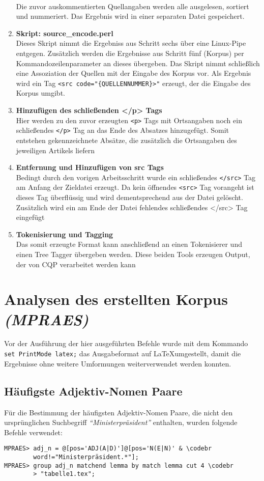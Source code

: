\documentclass[%
	type=document,%
  	style=article,%
  	media=print,
  	pages=oneside,%
  	prefixLecturer=Dozenten:,
  	author=multiple,
]{unihildesheim} %
\newcommand{\codebr}{\textbf{\rotatebox[origin=c]{180}{$\Rsh$}}}
\begin{document}
\begin{enumerate}
  \\ Die zuvor auskommentierten Quellangaben werden alle ausgelesen, sortiert
  und nummeriert. Das Ergebnis wird in einer separaten Datei gespeichert.
  \item \textbf{Skript: source\_encode.perl}
  \\Dieses Skript nimmt die Ergebniss aus Schritt sechs über eine Linux-Pipe
  entgegen. Zusätzlich werden die Ergebnisse aus Schritt fünf (Korpus) per
  Kommandozeilenparameter an dieses übergeben. Das Skript nimmt schließlich eine
  Assoziation der Quellen mit der Eingabe des Korpus vor. Als Ergebnis wird ein
  Tag \texttt{<src code="\{QUELLENNUMMER\}>"} erzeugt, der die Eingabe des
  Korpus umgibt.
  \item \textbf{Hinzufügen des schließenden </p> Tags}
  \\ Hier werden zu den zuvor erzeugten \texttt{<p>} Tags mit Ortsangaben noch
  ein schließendes \texttt{</p>} Tag an das Ende des Absatzes hinzugefügt. Somit
  entstehen gekennzeichnete Absätze, die zusätzlich die Ortsangaben des jeweiligen
  Artikels liefern
  \item \textbf{Entfernung und Hinzufügen von src Tags}
  \\ Bedingt durch den vorigen Arbeitsschritt wurde ein schließendes
  \texttt{</src>} Tag am Anfang der Zieldatei erzeugt. Da kein öffnendes
  \texttt{<src>} Tag vorangeht ist dieses Tag überflüssig und wird
  dementsprechend aus der Datei gelöscht.
  Zusätzlich wird ein am Ende der Datei fehlendes schließendes </src> Tag
  eingefügt
  \item \textbf{Tokenisierung und Tagging}
  \\ Das somit erzeugte Format kann anschließend an einen Tokenisierer und einen
  Tree Tagger übergeben werden. Diese beiden Tools erzeugen Output, der von CQP
  verarbeitet werden kann
\end{enumerate}

\section{Analysen des erstellten Korpus \textit{(MPRAES)}}
Vor der Ausführung der hier ausgeführten Befehle wurde mit dem Kommando
\texttt{set PrintMode latex;} das Ausgabeformat auf \LaTeX umgestellt, damit die
Ergebnisse ohne weitere Umformungen weiterverwendet werden konnten.


\subsection{Häufigste Adjektiv-Nomen Paare}
Für die Bestimmung der häufigsten Adjektiv-Nomen Paare, die nicht den
ursprünglichen Suchbegriff \textit{"`Ministerpräsident"'} enthalten, wurden
folgende Befehle verwendet:
\begin{Verbatim}[frame=single,label=CQP,commandchars=\\\{\}]
MPRAES> adj_n = @[pos='ADJ(A|D)']@[pos='N(E|N)' & \codebr
        word!="Ministerpräsident.*"];
MPRAES> group adj_n matchend lemma by match lemma cut 4 \codebr
        > "tabelle1.tex";
\end{Verbatim}
\end{document}
